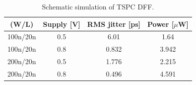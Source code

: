 

		\begin{table}[h!]
			\centering
			\def\arraystretch{1.5}		
			\setlength\arrayrulewidth{0.75pt}
			\setlength{\tabcolsep}{1em} %
			\begin{tabular}{|c|c|c|c|}
				\hline 
				\rule[-1ex]{0pt}{2.5ex} \cellcolor{gray!40}\textbf{(W/L)} & \cellcolor{gray!40}\textbf{Supply [V]} & \cellcolor{gray!40}\textbf{RMS jitter [ps]}& \cellcolor{gray!40}\textbf{Power [$\mu$W]}\\ 
				\hline 
				\rule[-1ex]{0pt}{2.5ex} 100n/20n  & 0.5 & 6.01 & 1.64\\ 
				\hline 
				\rule[-1ex]{0pt}{2.5ex} 100n/20n  & 0.8 & 0.832  & 3.942\\ 
				\hline 
				\rule[-1ex]{0pt}{2.5ex} 200n/20n  & 0.5 & 1.776 & 2.215 \\ 
				\hline 
				\rule[-1ex]{0pt}{2.5ex} 200n/20n  & 0.8 & 0.496  & 4.591 \\ 
				\hline 
			\end{tabular} 
			\caption{Schematic simulation of TSPC DFF.}
			\label{tab:dff}
		\end{table}   








